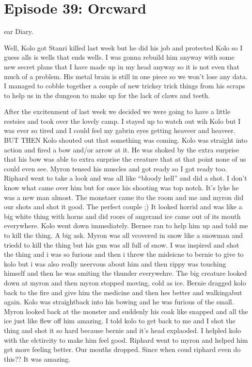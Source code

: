 \section{Episode 39: Orcward}

\begin{multicols}{2}

ear Diary.\medskip

Well, Kolo got Stanri killed last week but he did his job and protected Kolo so I guess alls is wells that ends wells. I was gonna rebuild him anyway with some new secret plans that I have made up in my head anyway so it is not even that much of a problem. His metal brain is still in one piece so we won’t lose any data. I managed to cobble together a couple of new tricksy trick things from his scraps to help us in the dungeon to make up for the lack of claws and teeth.\medskip

After the excitenment of last week we decided we were going to have a little restsies and took over the lovely camp. I stayed up to watch out wih Kolo but I was ever so tired and I could feel my gabrin eyes getting heaveer and heaveer. BUT THEN Kolo shouted out that something was coming. Kolo was straight into action and fired a bow and/or arrow at it. He was shoked by the extra surprise that his bow was able to extra surprise the creature that at that point none of us could even see. Myron tensed his muscles and got ready so I got ready too. Riphard went to take a look and was all like “bloody hell” and did a shot. I don’t know what came over him but for once his shooting was top notch. It’s lyke he was a new man almost. The monstaer came ito the room and me and myron did our shots and shot it good. The perfect couple ;) It looked horrid and was like a big white thing with horns and did roors of angerand ice came out of its mouth everywhere. Kolo went down immediately. Bernee ran to help him up and told me to kill the thing. A big ask. Myron was all vcovered in snow like a snowman and triedd to kill the thing but his gun was all full of snow. I was inspired and shot the thing and i was so furious and then i threw the mideicne to bernie to give to kolo but i was also really neervous about him and then rippy was touching himself and then he was smiting the thunder everywehre. The big creature looked down at myron and then myron stopped moving, cold as ice. Bernie dragged kolo back to the fire and give him the medicine and then hes better and walkingabut again. Kolo was straightback into his bowing and he was furious of the small. Myron looked back at the monster and suddenly his coak like snapped and all the ice just like flew off him amazing. I told kolo to get back to me and I shot the thing and shot it so hard because bernie and it’s head explaoded. I helpled kolo with the elctircity to make him feel good. Riphard went to myron and helped him get more feeling better. Our mouths dropped. Since when coud riphard even do this?? It was amazing.\medskip


\end{multicols}
